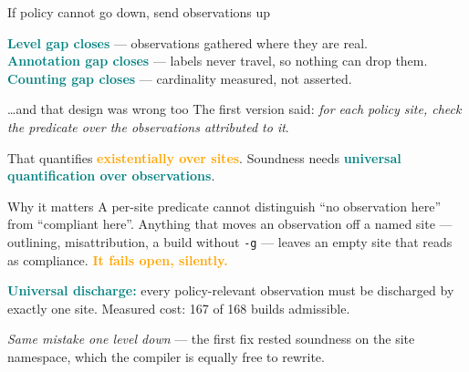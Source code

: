 \documentclass[aspectratio=169,10pt]{beamer}
\newcommand{\good}[1]{\textcolor{Teal}{\textbf{#1}}}
\newcommand{\bad}[1]{\textcolor{Orange}{\textbf{#1}}}
\newcommand{\code}[1]{\texttt{#1}}
\begin{document}
\begin{frame}{If policy cannot go down, send observations up}
  \begin{center}
  \end{center}

  \vspace{0.3em}
  \good{Level gap closes} --- observations gathered where they are real.\\
  \good{Annotation gap closes} --- labels never travel, so nothing can drop them.\\
  \good{Counting gap closes} --- cardinality measured, not asserted.
\end{frame}

\begin{frame}{\dots and that design was wrong too}
  The first version said: \emph{for each policy site, check the predicate over the
  observations attributed to it}.

  \vspace{0.6em}
  That quantifies \bad{existentially over sites}. Soundness needs
  \good{universal quantification over observations}.

  \begin{block}{Why it matters}
  A per-site predicate cannot distinguish ``no observation here'' from
  ``compliant here''. Anything that moves an observation off a named site ---
  outlining, misattribution, a build without \code{-g} --- leaves an empty site
  that reads as compliance. \bad{It fails open, silently.}
  \end{block}

  \vspace{0.4em}
  \good{Universal discharge:} every policy-relevant observation must be discharged
  by exactly one site. Measured cost: 167 of 168 builds admissible.

  \vspace{0.4em}
  \emph{Same mistake one level down} --- the first fix rested soundness on the
  site namespace, which the compiler is equally free to rewrite.
\end{frame}
\end{document}
